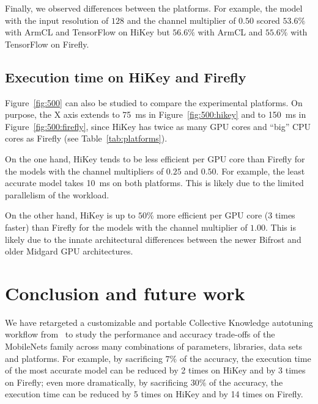 \documentclass[sigplan]{acmart}
\begin{document}
Finally, we observed differences between the platforms. 
%
For example, the model with the input resolution of $128$ and the channel
multiplier of $0.50$ scored $53.6\%$ with ArmCL and TensorFlow on HiKey but
$56.6\%$ with ArmCL and $55.6\%$ with TensorFlow on Firefly.

\subsection{Execution time on HiKey and Firefly}

Figure~\ref{fig:500} can also be studied to compare the experimental platforms.
%
On purpose, the X axis extends to 75~ms in Figure~\ref{fig:500:hikey} and to
150~ms in Figure~\ref{fig:500:firefly}, since HiKey has twice as many GPU cores
and ``big'' CPU cores as Firefly (see Table~\ref{tab:platforms}).
%

On the one hand, HiKey tends to be less efficient per GPU core than Firefly for
the models with the channel multipliers of $0.25$ and $0.50$. 
%
For example, the least accurate model takes 10~ms on both platforms.
%
This is likely due to the limited parallelism of the workload.

On the other hand, HiKey is up to $50\%$ more efficient per GPU core (3 times
faster) than Firefly for the models with the channel multiplier of $1.00$.
%
This is likely due to the innate architectural differences between the newer
Bifrost and older Midgard GPU architectures.

\section{Conclusion and future work}

We have retargeted a customizable and portable Collective Knowledge autotuning
workflow from~\cite{cm:29db2248aba45e59:c4b24bff57f4ad07} to study the performance
and accuracy trade-offs of the MobileNets family across many combinations of
parameters, libraries, data sets and platforms. 
%
For example, by sacrificing $7\%$ of the accuracy, the execution time of the
most accurate model can be reduced by 2 times on HiKey and by 3 times on
Firefly; even more dramatically, by sacrificing $30\%$ of the accuracy, the
execution time can be reduced by 5 times on HiKey and by 14 times on Firefly.
\end{document}
